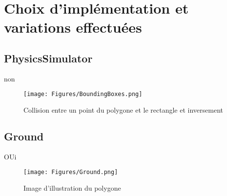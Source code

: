 \section{Choix d'implémentation et variations effectuées}

\subsection{PhysicsSimulator}
non
\begin{figure}
 \centering
 \texttt{[image: Figures/BoundingBoxes.png]}
 \caption{Collision entre un point du polygone et le rectangle et inversement}
 \label{figure:BoundingBoxes}
\end{figure}
\subsection{Ground}
OUi
\begin{figure}
 \centering
 \texttt{[image: Figures/Ground.png]}
 \caption{Image d'illustration du polygone}
 \label{figure:Ground}
\end{figure}
